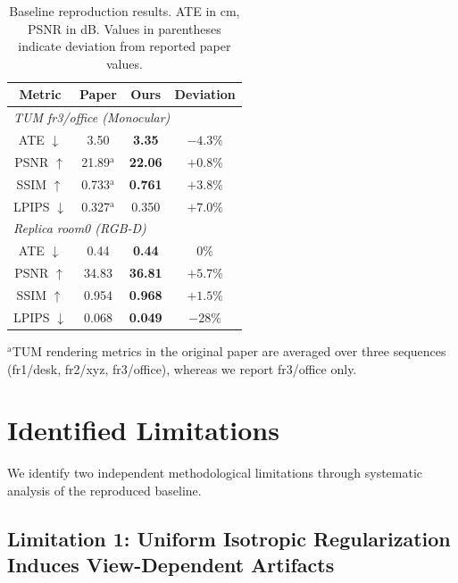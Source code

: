 \documentclass[conference]{IEEEtran}
\begin{document}
\begin{table}[htbp]
\caption{Baseline reproduction results. ATE in cm, PSNR in dB. Values in parentheses indicate deviation from reported paper values.}
\label{tab:baseline}
\begin{center}
\small
\setlength{\tabcolsep}{4pt}
\begin{tabular}{|c|c|c|c|}
\hline
\textbf{Metric} & \textbf{Paper} & \textbf{Ours} & \textbf{Deviation} \\
\hline
\multicolumn{4}{|l|}{\textit{TUM fr3/office (Monocular)}} \\
\hline
ATE $\downarrow$ & 3.50 & \textbf{3.35} & $-4.3\%$ \\
\hline
PSNR $\uparrow$ & 21.89$^\mathrm{a}$ & \textbf{22.06} & $+0.8\%$ \\
\hline
SSIM $\uparrow$ & 0.733$^\mathrm{a}$ & \textbf{0.761} & $+3.8\%$ \\
\hline
LPIPS $\downarrow$ & 0.327$^\mathrm{a}$ & 0.350 & $+7.0\%$ \\
\hline
\multicolumn{4}{|l|}{\textit{Replica room0 (RGB-D)}} \\
\hline
ATE $\downarrow$ & 0.44 & \textbf{0.44} & $0\%$ \\
\hline
PSNR $\uparrow$ & 34.83 & \textbf{36.81} & $+5.7\%$ \\
\hline
SSIM $\uparrow$ & 0.954 & \textbf{0.968} & $+1.5\%$ \\
\hline
LPIPS $\downarrow$ & 0.068 & \textbf{0.049} & $-28\%$ \\
\hline
\end{tabular}
\end{center}
\vspace{1mm}
{\footnotesize $^\mathrm{a}$TUM rendering metrics in the original paper are averaged over three sequences (fr1/desk, fr2/xyz, fr3/office), whereas we report fr3/office only.}
\end{table}

\section{Identified Limitations}
\label{sec:limitations}

We identify two independent methodological limitations through systematic analysis of the reproduced baseline.

\subsection{Limitation 1: Uniform Isotropic Regularization Induces View-Dependent Artifacts}
\label{sec:lim1}
\end{document}
